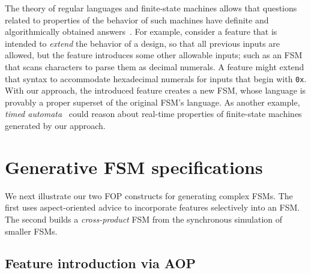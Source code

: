 \documentclass[conference]{IEEEtran}
\begin{document}
The theory of regular languages and finite-state machines allows that questions related to properties of the behavior of such machines have definite and algorithmically obtained answers~\cite{sipser}. For example, consider a feature that is intended to \emph{extend} the behavior of a design, so that all previous inputs are allowed, but the feature introduces some other allowable inputs; such as an FSM that scans characters to parse them as decimal numerals.  A feature might extend that syntax to accommodate hexadecimal numerals for inputs that begin with \texttt{0x}.  With our approach, the introduced feature creates a new FSM, whose language is provably a proper superset of the original FSM's language.  As another example, \emph{timed automata}~\cite{10.1145/2518102} could reason about real-time properties of finite-state machines generated by our approach.   

\section{Generative FSM specifications}

We next illustrate our two FOP constructs for generating complex FSMs.  The first uses aspect-oriented advice to incorporate features selectively into an FSM.  The second builds a \emph{cross-product} FSM from the synchronous simulation of smaller FSMs.

\subsection{Feature introduction via AOP}\label{sec:vend}
\end{document}
